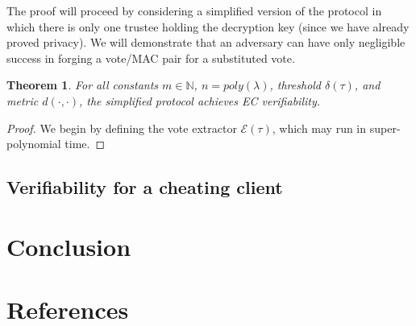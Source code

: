 \documentclass[12pt,a4paper]{article}
\newtheorem{theorem}{Theorem}
\theoremstyle{definition}
\begin{document}
The proof will proceed by considering a simplified version of the protocol in which there is only one trustee holding the decryption key (since we have already proved privacy). We will demonstrate that an adversary can have only negligible success in forging a vote/MAC pair for a substituted vote.

\begin{theorem}
    For all constants $m\in\mathbb{N}$, $n=poly(\lambda)$, threshold $\delta(\tau)$, and metric $d(\cdot, \cdot)$, the simplified protocol achieves EC verifiability.
\end{theorem}
\begin{proof}
    We begin by defining the vote extractor $\mathcal{E}(\tau)$, which may run in super-polynomial time.
\end{proof}
\subsection{Verifiability for a cheating client}
\section{Conclusion}
\newpage
\section{References}


\newpage
\appendix
\end{document}
